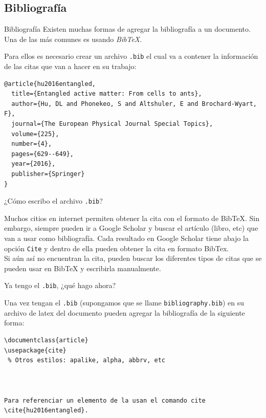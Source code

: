 \subsection{Bibliografía}
\begin{frame}[fragile]{Bibliografía}
Existen muchas formas de agregar la bibliografía a un documento. Una de las más
comunes es usando \emph{BibTeX}.\\[2mm]

\pause

Para ellos es necesario crear un archivo \texttt{.bib} el cual va a contener la
información de las citas que van a hacer en su trabajo:

\begin{lstlisting}[basicstyle=\tiny]
@article{hu2016entangled,
  title={Entangled active matter: From cells to ants},
  author={Hu, DL and Phonekeo, S and Altshuler, E and Brochard-Wyart, F},
  journal={The European Physical Journal Special Topics},
  volume={225},
  number={4},
  pages={629--649},
  year={2016},
  publisher={Springer}
}
\end{lstlisting}

\end{frame}

\begin{frame}{¿Cómo escribo el archivo \texttt{.bib}?}

Muchos citios en internet permiten obtener la cita con el formato de
BibTeX. Sin embargo, siempre pueden ir a Google Scholar y buscar el artículo
(libro, etc) que van a usar como bibliografía. Cada resultado en Google
Scholar tiene abajo la opción \texttt{Cite} y dentro de ella pueden obtener
la cita en formato BibTex.\\[3mm]

Si aún así no encuentran la cita, pueden buscar los diferentes tipos de citas
que se pueden usar en BibTeX y escribirla manualmente.

\end{frame}

\begin{frame}[fragile]{Ya tengo el \texttt{.bib}, ¿qué hago ahora?}

Una vez tengan el \texttt{.bib} (supongamos que se llame
\texttt{bibliography.bib}) en su archivo de latex del documento pueden agregar
la bibliografía de la siguiente forma:

\begin{lstlisting}[basicstyle=\tiny]
\documentclass{article}
\usepackage{cite}
 % Otros estilos: apalike, alpha, abbrv, etc



Para referenciar un elemento de la usan el comando cite \cite{hu2016entangled}.



\end{lstlisting}

\end{frame}

